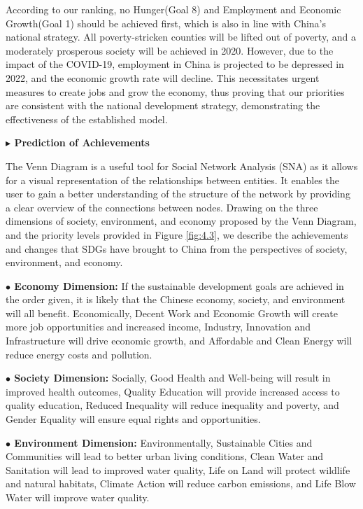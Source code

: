 \documentclass[12pt]{article}  %
\begin{document}
According to our ranking,  no Hunger(Goal 8) and  Employment and Economic Growth(Goal 1) should be achieved first, which is also in line with China's national strategy. All poverty-stricken counties will be lifted out of poverty, and a moderately prosperous society will be achieved in 2020.  However, due to the impact of the COVID-19,  employment in China is projected to be depressed in 2022, and the economic growth rate will decline. This necessitates urgent measures to create jobs and grow the economy, thus proving that our priorities are consistent with the national development strategy, demonstrating the effectiveness of the established model.


\vspace{0.7mm}\begin{itshape}
\textbf{$\blacktriangleright$
Prediction of Achievements}\end{itshape}

The Venn Diagram is a useful tool for Social Network Analysis (SNA) as it allows for a visual representation of the relationships between entities. It enables the user to gain a better understanding of the structure of the network by providing a clear overview of the connections between nodes. 
Drawing on the three dimensions of society, environment, and economy proposed by the Venn Diagram, and the priority levels provided in Figure \ref{fig:4.3}, we describe the achievements and changes that SDGs have brought to China from the perspectives of society, environment, and economy.


\textbf{$\bullet$ Economy Dimension:} If the sustainable development goals are achieved in the order given, it is likely that the Chinese economy, society, and environment will all benefit. Economically, Decent Work and Economic Growth will create more job opportunities and increased income, Industry, Innovation and Infrastructure will drive economic growth, and Affordable and Clean Energy will reduce energy costs and pollution. 

\textbf{$\bullet$ Society Dimension:} Socially, Good Health and Well-being will result in improved health outcomes, Quality Education will provide increased access to quality education, Reduced Inequality will reduce inequality and poverty, and Gender Equality will ensure equal rights and opportunities. 

\textbf{$\bullet$ Environment Dimension:} Environmentally, Sustainable Cities and Communities will lead to better urban living conditions, Clean Water and Sanitation will lead to improved water quality, Life on Land will protect wildlife and natural habitats, Climate Action will reduce carbon emissions, and Life Blow Water will improve water quality.
\end{document}
